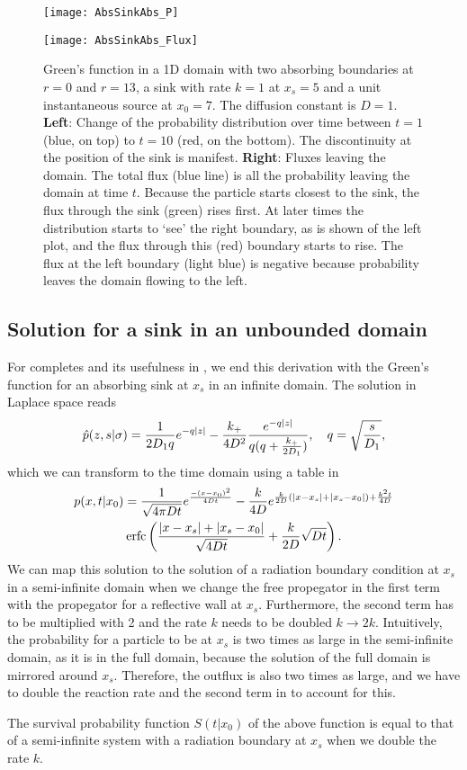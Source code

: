 \begin{figure}[ht]
\begin{minipage}[ht]{.5\linewidth}
\centering
\texttt{[image: AbsSinkAbs\_P]}
\end{minipage}
\begin{minipage}[ht]{.5\linewidth}
\centering
\texttt{[image: AbsSinkAbs\_Flux]}
\end{minipage}
\caption{ Green's function in a 1D domain with two absorbing boundaries at $r=0$ and $r=13$, a sink with rate $k=1$ at $x_s=5$ and a unit instantaneous source at $x_0=7$. The diffusion constant is $D=1$. {\bf Left}: Change of the probability distribution over time between $t=1$ (blue, on top) to $t=10$ (red, on the bottom). The discontinuity at the position of the sink is manifest. {\bf Right}: Fluxes leaving the domain. The total flux (blue line) is all the probability leaving the domain at time $t$. Because the particle starts closest to the sink, the flux through the sink (green) rises first. At later times the distribution starts to `see' the right boundary, as is shown of the left plot, and the flux through this (red) boundary starts to rise. The flux at the left boundary (light blue) is negative because probability leaves the domain flowing to the left. 
}
\end{figure}

\subsection{Solution for a sink in an unbounded domain}
For completes and its usefulness in \GFRD, we end this derivation with the Green's function for an absorbing sink at $x_s$ in an infinite domain. The solution in Laplace space reads
\begin{equation}
 \hat{p}(z,s|\sigma) = \frac{1}{2 D_1 q}e^{-q|z|} - \frac{k_+}{4 D^2}\frac{e^{-q|z|}}{q(q+\frac{k_+}{2 D_1})}, \quad q=\sqrt{\frac{s}{D_1}},
 \elabel{LSOL_NB}
\end{equation}
which we can transform to the time domain using a table in \cite{Carslaw1959}
\begin{multline}
 p(x,t|x_0) = \frac{1}{\sqrt{4 \pi D t}}e^{\frac{-(x-x_0)^2}{4 D t}} - \frac{k}{4 D}e^{\frac{k}{2 D}(|x-x_s|+|x_s-x_0|)+\frac{k^2 t}{4 D}} \\
\mathrm{erfc}\left( \frac{|x-x_s|+|x_s-x_0|}{\sqrt{4 D t}}+\frac{k}{2D}\sqrt{D t} \right).
\elabel{FSOL_NB}
\end{multline}
We can map this solution to the solution of a radiation boundary condition at $x_s$ in a semi-infinite domain when we change the free propegator in the first term with the propegator for a reflective wall at $x_s$. Furthermore, the second term has to be multiplied with 2 and the rate $k$ needs to be doubled $k \rightarrow 2 k$. Intuitively, the probability for a particle to be at $x_s$ is two times as large in the semi-infinite domain, as it is in the full domain, because the solution of the full domain is mirrored around $x_s$. Therefore, the outflux is also two times as large, and we have to double the reaction rate and the second term in  to account for this.

The survival probability function $S(t|x_0)$ of the above function is equal to that of a semi-infinite system with a radiation boundary at $x_s$ when we double the rate $k$.